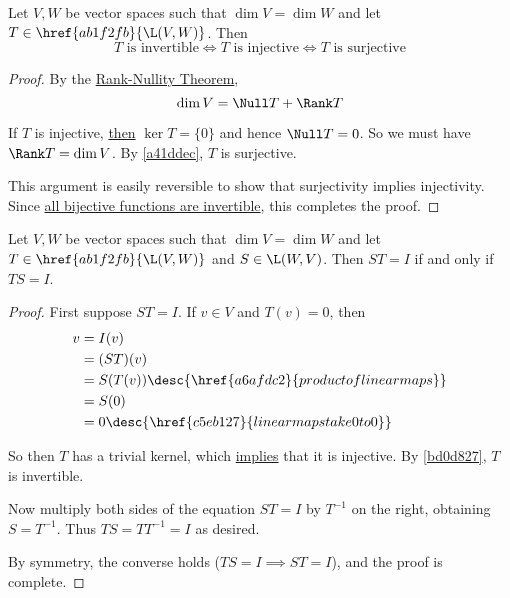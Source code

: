 \label{bd0d827}

Let $V,W$ be vector spaces such that $\dim V=\dim W$ and let
$T\in\href{ab1f2fb}{\L(V,W)}$. Then
$$
  T\text{ is invertible}\iff T\text{ is injective}\iff T\text{ is surjective}
$$

\begin{proof}
  By the \href{e83dffc}{Rank-Nullity Theorem},
  $$
    \dim V=\Null T+\Rank T
  $$

  If $T$ is injective, \href{f68db52}{then} $\ker T=\{0\}$ and hence $\Null
  T=0$. So we must have $\Rank T=\dim V$. By \autoref{a41ddec}, $T$ is
  surjective.

  This argument is easily reversible to show that surjectivity implies
  injectivity. Since \href{b2530a8}{all bijective functions are invertible},
  this completes the proof.
\end{proof}

\label{ddb6618}

Let $V,W$ be vector spaces such that $\dim V=\dim W$ and let
$T\in\href{ab1f2fb}{\L(V,W)}$ and $S\in\L(W,V)$. Then $ST=I$ if and only if
$TS=I$.

\begin{proof}
  First suppose $ST=I$. If $v\in V$ and $T(v)=0$, then
  \begin{align*}
    v &=I(v)                                                 \\
      &=(ST)(v)                                              \\
      &=S(T(v))\desc{\href{a6afdc2}{product of linear maps}} \\
      &=S(0)                                                 \\
      &=0\desc{\href{c5eb127}{linear maps take 0 to 0}}
  \end{align*}

  So then $T$ has a trivial kernel, which \href{f68db52}{implies} that it is
  injective. By \autoref{bd0d827}, $T$ is invertible.

  Now multiply both sides of the equation $ST=I$ by $T^{-1}$ on the right,
  obtaining $S=T^{-1}$. Thus $TS=TT^{-1}=I$ as desired.

  By symmetry, the converse holds ($TS=I\implies ST=I$), and the proof is
  complete.
\end{proof}
